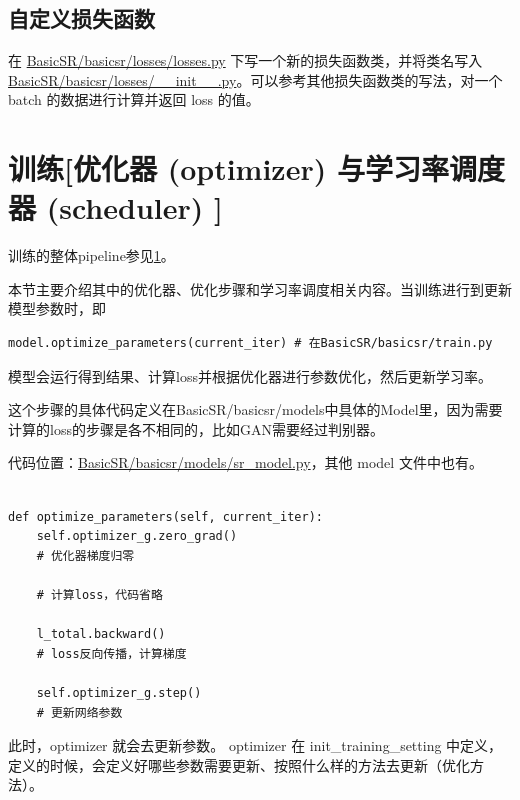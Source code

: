 \documentclass[../main.tex]{subfiles}
\begin{document}
\subsection{自定义损失函数}

在 \href{https://github.com/XPixelGroup/BasicSR/blob/master/basicsr/losses/losses.py}{BasicSR/basicsr/losses/losses.py} 下写一个新的损失函数类，并将类名写入\href{https://github.com/XPixelGroup/BasicSR/blob/master/basicsr/losses/__init__.py}{BasicSR/basicsr/losses/\_\_init\_\_.py}。可以参考其他损失函数类的写法，对一个 batch 的数据进行计算并返回 loss 的值。

\section{训练[优化器 (optimizer) 与学习率调度器 (scheduler) ]}

\begin{note} %
	训练的整体pipeline参见\ref{}。
\end{note}

本节主要介绍其中的优化器、优化步骤和学习率调度相关内容。当训练进行到更新模型参数时，即
\begin{verbatim}
model.optimize_parameters(current_iter) # 在BasicSR/basicsr/train.py
\end{verbatim}

模型会运行得到结果、计算loss并根据优化器进行参数优化，然后更新学习率。

这个步骤的具体代码定义在BasicSR/basicsr/models中具体的Model里，因为需要计算的loss的步骤是各不相同的，比如GAN需要经过判别器。

代码位置：\href{https://github.com/XPixelGroup/BasicSR/blob/master/basicsr/models/sr_model.py}{BasicSR/basicsr/models/sr\_model.py}，其他 model 文件中也有。

\begin{verbatim}

def optimize_parameters(self, current_iter):
    self.optimizer_g.zero_grad()
    # 优化器梯度归零

    # 计算loss，代码省略
    
    l_total.backward()
    # loss反向传播，计算梯度
    
    self.optimizer_g.step()
    # 更新网络参数
\end{verbatim}

此时，optimizer 就会去更新参数。 optimizer 在 init\_training\_setting 中定义，定义的时候，会定义好哪些参数需要更新、按照什么样的方法去更新（优化方法）。
\end{document}
